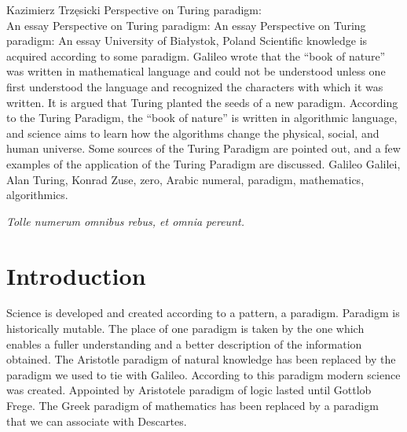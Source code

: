 \begin{artengenv}{Kazimierz Trzęsicki}
	{Perspective on Turing paradigm:\\An essay}
	{Perspective on Turing paradigm: An essay}
	{Perspective on Turing paradigm: An essay}
	{University of Białystok, Poland}
	{Scientific knowledge is acquired according to some paradigm. Galileo wrote that the ``book of nature'' was written in mathematical language and could not be understood unless one first understood the language and recognized the characters with which it was written. It is argued that Turing planted the seeds of a new paradigm. According to the Turing Paradigm, the ``book of nature'' is written in algorithmic language, and science aims to learn how the algorithms change the physical, social, and human universe. Some sources of the Turing Paradigm are pointed out, and a few examples of the application of the Turing Paradigm are discussed.
	}
	{Galileo Galilei, Alan Turing, Konrad Zuse, zero, Arabic numeral, paradigm, mathematics, algorithmics.}

 
  
\epigraph{{\footnotesize \textit{Tolle numerum omnibus rebus, et omnia pereunt.} }}{
{\footnotesize
\begin{flushleft}
\parencite[Liber III, \textit{De mathematica}, IV. \textit{Quid praestent numeri}]{Izydor1911}
\end{flushleft}
}\hfill \phantom{}}


\section{Introduction}

\lettrine[loversize=0.13,lines=2,lraise=-0.03,nindent=0em,findent=0.2pt]%
{S}{}cience is developed and created  according to a pattern, a paradigm. Paradigm is historically mutable. The place of one paradigm is taken by the one which enables a fuller understanding and a better description of the information obtained. The Aristotle paradigm of natural knowledge has been replaced by the paradigm  we used to tie with Galileo. According to this paradigm modern science was created. Appointed by Aristotele paradigm of logic lasted until Gottlob Frege. The Greek paradigm of mathematics has been replaced by a paradigm that we can associate with Descartes.


\end{artengenv}
